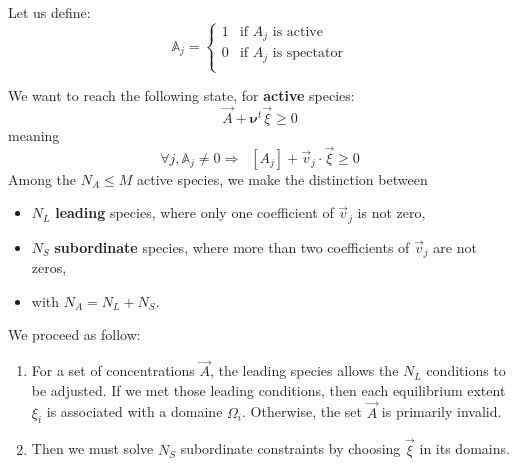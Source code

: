 \documentclass[aps,onecolumn,11pt]{revtex4}
\begin{document}
Let us define:
\begin{equation}
	\mathbb{A}_j = \left\lbrace
	\begin{array}{cl}
	1 & \text{if $A_j$ is active}\\
	0 & \text{if $A_j$ is spectator}\\
	\end{array}
	\right.
\end{equation}

We want to reach the following state, for \textbf{active} species:
\begin{equation}
	\vec{A} + \bm{\nu}^t \vec{\xi} \geq 0
\end{equation}
meaning
\begin{equation}
	\forall j, \mathbb{A}_j\not=0 \Rightarrow \;\; [A_j] + \vec{v}_j \cdot \vec{\xi} \geq 0
\end{equation}
Among the $N_A\leq M$ active species, we make the distinction between 
\begin{itemize}
\item  $N_L$ \textbf{leading} species, where only one coefficient of $\vec{v}_j$ is not zero,
\item  $N_S$ \textbf{subordinate} species, where more than two coefficients of $\vec{v}_j$ are not zeros,
\item  with $N_A=N_L+N_S$.
\end{itemize}
We proceed as follow:
\begin{enumerate}
\item For a set of concentrations $\vec{A}$, the leading species allows the $N_L$ conditions to be adjusted.
If we met those leading conditions, then each equilibrium extent $\xi_i$ is associated with a domaine $\Omega_i$.
Otherwise, the set $\vec{A}$ is primarily invalid.

\item Then we must solve $N_S$ subordinate constraints by choosing $\vec{\xi}$ in its domains.
\end{enumerate}


%
 
\end{document}
